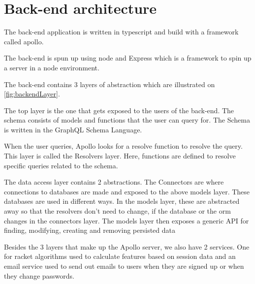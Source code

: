 \section{Back-end architecture}

The back-end application is written in \gls{typescript} and build with a framework called \gls{apollo}.

The back-end is spun up using \gls{node} and Express which is a framework to spin up a server in a \gls{node} environment.

The back-end contains 3 layers of abstraction which are illustrated on \ref{fig:backendLayer}.


The top layer is the one that gets exposed to the users of the back-end. The schema consists of models and functions that the user can query for. The Schema is written in the GraphQL Schema Language.

When the user queries, Apollo looks for a resolve function to resolve the query. This layer is called the Resolvers layer. Here, functions are defined to resolve specific queries related to the schema. 

The data access layer contains 2 abstractions. The Connectors are where connections to databases are made and exposed to the above models layer. These databases are used in different ways. In the models layer, these are abstracted away so that the resolvers don't need to change, if the database or the \gls{orm} changes in the connectors layer. The models layer then exposes a generic API for finding, modifying, creating and removing persisted data

Besides the 3 layers that make up the Apollo server, we also have 2 services. One for racket algorithms used to calculate features based on session data and an email service used to send out emails to users when they are signed up or when they change passwords.